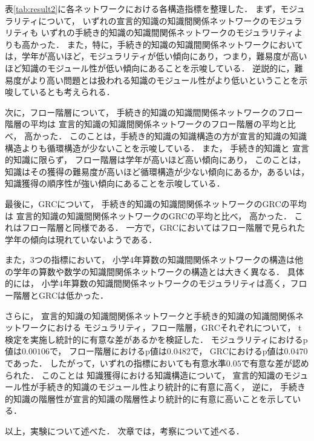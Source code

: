 表\ref{tab:result2}に各ネットワークにおける各構造指標を整理した．
まず，モジュラリティについて，
いずれの宣言的知識の知識間関係ネットワークのモジュラリティも
いずれの手続き的知識の知識間関係ネットワークのモジュラリティよりも高かった．
また，特に，手続き的知識の知識間関係ネットワークにおいては，学年が高いほど，モジュラリティが低い傾向にあり，つまり，難易度が高いほど知識のモジュール性が低い傾向にあることを示唆している．
逆説的に，難易度がより高い問題とは扱われる知識のモジュール性がより低いということを示唆しているとも考えられる．
 

次に，フロー階層について，
手続き的知識の知識間関係ネットワークのフロー階層の平均は
宣言的知識の知識間関係ネットワークのフロー階層の平均と比べ，
高かった．
このことは，手続き的知識の知識構造の方が宣言的知識の知識構造よりも循環構造が少ないことを示唆している．
また，
手続き的知識と
宣言的知識に限らず，
フロー階層は学年が高いほど高い傾向にあり，
このことは，知識はその獲得の難易度が高いほど循環構造が少ない傾向にあるか，あるいは，
知識獲得の順序性が強い傾向にあることを示唆している．

最後に，GRCについて，
手続き的知識の知識間関係ネットワークのGRCの平均は
宣言的知識の知識間関係ネットワークのGRCの平均と比べ，
高かった．
これはフロー階層と同様である．
一方で，GRCにおいてはフロー階層で見られた学年の傾向は現れていないようである．

また，3つの指標において，
小学4年算数の知識間関係ネットワークの構造は他の学年の算数や数学の知識間関係ネットワークの構造とは大きく異なる．
具体的には，
小学4年算数の知識間関係ネットワークのモジュラリティは高く，フロー階層とGRCは低かった．

さらに，
宣言的知識の知識間関係ネットワークと手続き的知識の知識間関係ネットワークにおける
モジュラリティ，フロー階層，GRCそれぞれについて，
t検定を実施し統計的に有意な差があるかを検証した．
モジュラリティにおけるp値は$0.00106$で，
フロー階層におけるp値は$0.0482$で，
GRCにおけるp値は$0.0470$
であった．
したがって，いずれの指標においても有意水準$0.05$で有意な差が認められた．
このことは
知識獲得における知識構造について，
宣言的知識のモジュール性が手続き的知識のモジュール性より統計的に有意に高く，
逆に，
手続き的知識の階層性が宣言的知識の階層性より統計的に有意に高いことを示している．









\vvspace
以上，実験について述べた．
次章では，考察について述べる．



